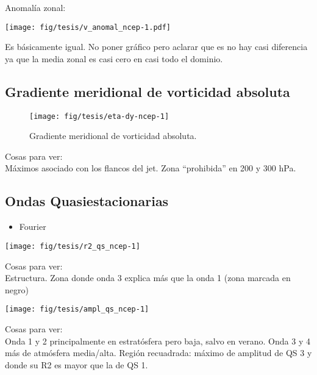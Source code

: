 \documentclass[spanish,a4paper]{book}
\providecommand{\tightlist}{%
  \setlength{\itemsep}{0pt}\setlength{\parskip}{0pt}}
\begin{document}
Anomalía zonal:

\texttt{[image: fig/tesis/v\_anomal\_ncep-1.pdf]}

Es básicamente igual. No poner gráfico pero aclarar que es no hay casi
diferencia ya que la media zonal es casi cero en casi todo el dominio.

\subsection{Gradiente meridional de vorticidad
absoluta}\label{gradiente-meridional-de-vorticidad-absoluta}

\begin{figure}

{\centering \texttt{[image: fig/tesis/eta-dy-ncep-1]} 

}

\caption{Gradiente meridional de vorticidad absoluta.}\label{fig:eta-dy-ncep}
\end{figure}

Cosas para ver:\\
Máximos asociado con los flancos del jet. Zona ``prohibida'' en 200 y
300 hPa.

\subsection{Ondas Quasiestacionarias}\label{ondas-quasiestacionarias}

\begin{itemize}
\tightlist
\item
  Fourier
\end{itemize}

\begin{center}\texttt{[image: fig/tesis/r2\_qs\_ncep-1]} \end{center}

Cosas para ver:\\
Estructura. Zona donde onda 3 explica más que la onda 1 (zona marcada en
negro)

\begin{center}\texttt{[image: fig/tesis/ampl\_qs\_ncep-1]} \end{center}

Cosas para ver:\\
Onda 1 y 2 principalmente en estratósfera pero baja, salvo en verano.
Onda 3 y 4 más de atmósfera media/alta. Región recuadrada: máximo de
amplitud de QS 3 y donde su R2 es mayor que la de QS 1.
\end{document}
